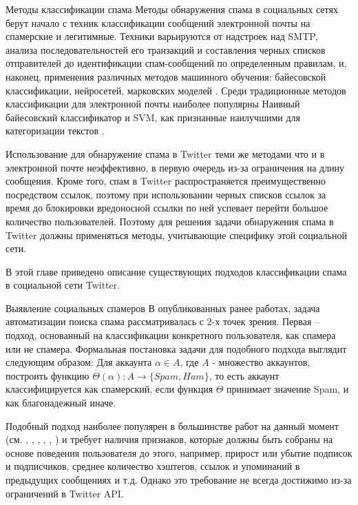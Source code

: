
\clearpage
\begin{section}{Методы классификации спама}
Методы обнаружения спама в социальных сетях берут начало с
техник классификации сообщений электронной почты на
спамерские и легитимные.
Техники варьируются от надстроек над SMTP,
анализа последовательностей его транзакций и
составления черных списков отправителей до
идентификации спам-сообщений по определенным правилам,
и, наконец, применения различных методов машинного обучения:
байесовской классификации, нейросетей, марковских моделей \cite{Caruana}.
Среди традиционные методов классификации для электронной почты
наиболее популярны Наивный байесовский классификатор и SVM,
как признанные наилучшими для категоризации текстов \cite{Almeida}.

Использование для обнаружение спама в Twitter теми же методами
что и в электронной почте неэффективно,
в первую очередь из-за ограничения на длину сообщения.
Кроме того, спам в Twitter распространяется преимущественно
посредством ссылок, поэтому при использовании черных списков
ссылок за время до блокировки вредоносной ссылки по ней успевает
перейти большое количество пользователей. Поэтому для решения
задачи обнаружения спама в Twitter должны применяться методы,
учитывающие специфику этой социальной сети.

В этой главе приведено описание существующих подходов классификации спама в социальной сети Twitter.

\begin{subsection}{Выявление социальных спамеров}
  В опубликованных ранее работах,
  задача автоматизации поиска спама рассматривалась с
  2-х точек зрения.
  Первая – подход, основанный на классификации
  конкретного пользователя, как спамера или не спамера.
  Формальная постановка задачи для подобного подхода
  выглядит следующим образом:
  Для аккаунта $\alpha \in A$, где $A$ - множество аккаунтов, построить функцию ${\Theta(\alpha): A\rightarrow\{Spam, Ham\}}$,
  то есть аккаунт классифицируется как спамерский, если функция $\Theta$ принимает значение Spam, и как благонадежный иначе.

  Подобный подход наиболее популярен в
  большинстве работ на данный момент (см. \cite{Wang}, \cite{Benevenuto}, \cite{McCord}, \cite{Lee}, \cite{Yang}, \cite{Ferrara})
  и требует наличия признаков, которые должны быть собраны на основе поведения пользователя до этого, например, прирост или убытие подписок и подписчиков, среднее количество хэштегов, ссылок и упоминаний в предыдущих сообщениях и т.д.
  Однако это требование не всегда достижимо из-за ограничений в Twitter API.


\end{subsection}
\end{section}
